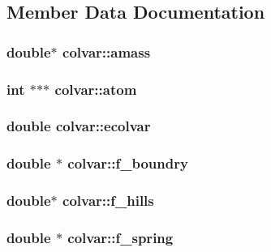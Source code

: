 \subsection{Member Data Documentation}
\subsubsection{\setlength{\rightskip}{0pt plus 5cm}double$\ast$ {\bf colvar::amass}}\label{structcolvar_65eb2b9c00b0921a1810aa00d76e6f6a}


\subsubsection{\setlength{\rightskip}{0pt plus 5cm}int $\ast$$\ast$$\ast$ {\bf colvar::atom}}\label{structcolvar_36502226cc607e73ca1aa703dd52d07a}


\subsubsection{\setlength{\rightskip}{0pt plus 5cm}double {\bf colvar::ecolvar}}\label{structcolvar_772033ebe69c0d82f7edd3172b55060d}


\subsubsection{\setlength{\rightskip}{0pt plus 5cm}double $\ast$ {\bf colvar::f\_\-boundry}}\label{structcolvar_74b1d404ae0aee81b288e1a911253003}


\subsubsection{\setlength{\rightskip}{0pt plus 5cm}double$\ast$ {\bf colvar::f\_\-hills}}\label{structcolvar_295bdd492df36cea989ac070e3755ef9}


\subsubsection{\setlength{\rightskip}{0pt plus 5cm}double $\ast$ {\bf colvar::f\_\-spring}}\label{structcolvar_97677444238dfa51a66e81194fd4b3c3}


